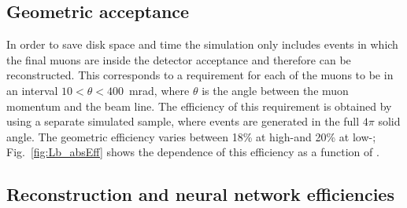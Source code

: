 \subsection{Geometric acceptance}
\label{sec:Lb_geomAcc}
In order to save disk space and time the simulation only includes events in which the final muons
are inside the detector acceptance and therefore can be reconstructed. This corresponds to a requirement for each
of the muons to be in an interval \mbox{$10 < \theta < 400$~mrad}, where $\theta$ is the angle between
the muon momentum and the beam line. The efficiency of this requirement is obtained by using 
a separate simulated sample, where events are generated in the full $4\pi$ solid angle.
The geometric efficiency varies between 18\% at high-\qsq and 20\% at low-\qsq;
Fig.~\ref{fig:Lb_absEff} shows the dependence of this efficiency as a function of \qsq.

%


\subsection{Reconstruction and neural network efficiencies}

